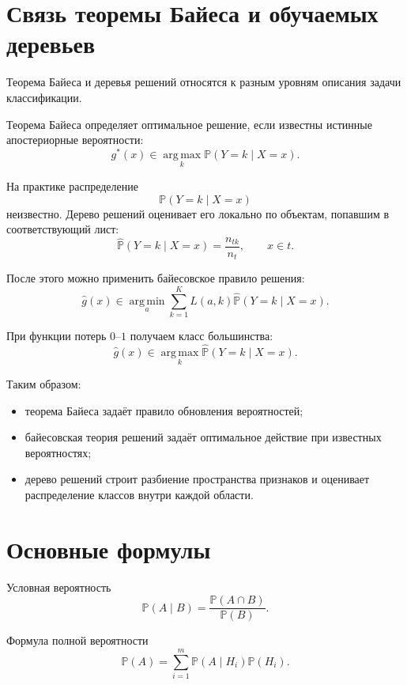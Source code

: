 \documentclass[12pt,a4paper]{article}
\theoremstyle{plain}
\theoremstyle{definition}
\theoremstyle{remark}
\newcommand{\Pp}{\mathbb{P}}
\newcommand{\argmax}{\operatorname*{arg\,max}}
\newcommand{\argmin}{\operatorname*{arg\,min}}
\begin{document}
\section{Связь теоремы Байеса и обучаемых деревьев}

Теорема Байеса и деревья решений относятся к разным уровням описания
задачи классификации.

Теорема Байеса определяет оптимальное решение, если известны истинные
апостериорные вероятности:
\[
    g^*(x)
    \in
    \argmax_k\Pp(Y=k\mid X=x).
\]

На практике распределение
\[
    \Pp(Y=k\mid X=x)
\]
неизвестно. Дерево решений оценивает его локально по объектам,
попавшим в соответствующий лист:
\[
    \widehat{\Pp}(Y=k\mid X=x)
    =
    \frac{n_{tk}}{n_t},
    \qquad x\in t.
\]

После этого можно применить байесовское правило решения:
\[
    \widehat{g}(x)
    \in
    \argmin_a
    \sum_{k=1}^{K}
    L(a,k)
    \widehat{\Pp}(Y=k\mid X=x).
\]

При функции потерь $0$--$1$ получаем класс большинства:
\[
    \widehat{g}(x)
    \in
    \argmax_k
    \widehat{\Pp}(Y=k\mid X=x).
\]

Таким образом:
\begin{itemize}
    \item теорема Байеса задаёт правило обновления вероятностей;
    \item байесовская теория решений задаёт оптимальное действие при
    известных вероятностях;
    \item дерево решений строит разбиение пространства признаков и
    оценивает распределение классов внутри каждой области.
\end{itemize}

\section{Основные формулы}

\begin{importantblock}{Условная вероятность}
\[
    \Pp(A\mid B)
    =
    \frac{\Pp(A\cap B)}{\Pp(B)}.
\]
\end{importantblock}

\begin{importantblock}{Формула полной вероятности}
\[
    \Pp(A)
    =
    \sum_{i=1}^{m}
    \Pp(A\mid H_i)\Pp(H_i).
\]
\end{importantblock}
\end{document}
